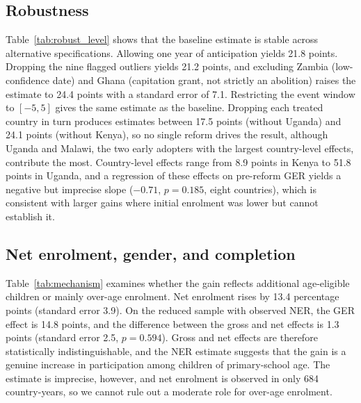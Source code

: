 \documentclass[12pt]{article}
\begin{document}
\subsection{Robustness}

Table~\ref{tab:robust_level} shows that the baseline estimate is stable across alternative specifications. Allowing one year of anticipation yields 21.8 points. Dropping the nine flagged outliers yields 21.2 points, and excluding Zambia (low-confidence date) and Ghana (capitation grant, not strictly an abolition) raises the estimate to 24.4 points with a standard error of 7.1.
Restricting the event window to $[-5,5]$ gives the same estimate as the baseline.
Dropping each treated country in turn produces estimates between 17.5 points (without Uganda) and 24.1 points (without Kenya), so no single reform drives the result, although Uganda and Malawi, the two early adopters with the largest country-level effects, contribute the most.
Country-level effects range from 8.9 points in Kenya to 51.8 points in Uganda, and a regression of these effects on pre-reform GER yields a negative but imprecise slope ($-0.71$, $p = 0.185$, eight countries), which is consistent with larger gains where initial enrolment was lower but cannot establish it.





\subsection{Net enrolment, gender, and completion}

Table~\ref{tab:mechanism} examines whether the gain reflects additional age-eligible children or mainly over-age enrolment. Net enrolment rises by 13.4 percentage points (standard error 3.9). On the reduced sample with observed NER, the GER effect is 14.8 points, and the difference between the gross and net effects is 1.3 points (standard error 2.5, $p = 0.594$).
Gross and net effects are therefore statistically indistinguishable, and the NER estimate suggests that the gain is a genuine increase in participation among children of primary-school age. The estimate is imprecise, however, and net enrolment is observed in only 684 country-years, so we cannot rule out a moderate role for over-age enrolment.
\end{document}
